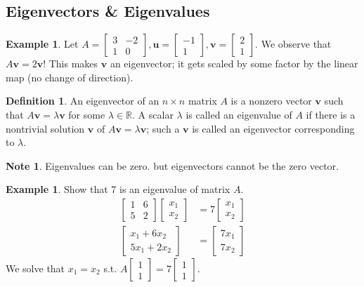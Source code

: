 \documentclass{article}
\numberwithin{equation}{section}
\theoremstyle{definition}
\newtheorem{defn}{Definition}[subsection]
\newtheorem{ex}[thm]{Example}
\newtheorem{note}{Note}[subsection]
\newcommand{\V}{\mathbf{v}}
\newcommand{\U}{\mathbf{u}}
\newcommand{\R}{\mathbb{R}}
\newcommand{\x}{\times}
\theoremstyle{adefn}
\begin{document}
	\subsection{Eigenvectors \& Eigenvalues}
	\begin{ex}
		Let $A = \begin{bmatrix}
			3 & -2 \\ 1 & 0
		\end{bmatrix}, \U = \begin{bmatrix}
			-1 \\ 1
		\end{bmatrix}, \V = \begin{bmatrix}
			2 \\ 1
		\end{bmatrix}$. We observe that $A\V = 2\V$! This makes $\V$ an eigenvector; it gets scaled by some factor by the linear map (no change of direction). 
	\end{ex}
	\begin{defn}
		An eigenvector of an $n \x n$ matrix $A$ is a nonzero vector $\V$ such that $A\V = \lambda\V$ for some $\lambda \in \R$. A scalar $\lambda$ is called an eigenvalue of $A$ if there is a nontrivial solution $\V$ of $A\V = \lambda\V$; such a $\V$ is called an eigenvector corresponding to $\lambda$. 
	\end{defn}
	\begin{note}
		Eigenvalues can be zero. but eigenvectors cannot be the zero vector. 
	\end{note}
	\begin{ex}
		Show that 7 is an eigenvalue of matrix $A$. 
		\begin{align*}
			\begin{bmatrix}
				1 & 6 \\ 5 & 2
			\end{bmatrix}\begin{bmatrix}
				x_1 \\ x_2
			\end{bmatrix} &= 7\begin{bmatrix}
				x_1 \\ x_2
			\end{bmatrix} \\ 
			\begin{bmatrix}
				x_1 + 6x_2 \\ 
				5x_1 + 2x_2
			\end{bmatrix} &= \begin{bmatrix}
				7x_1 \\ 7x_2
			\end{bmatrix}
		\end{align*}
		We solve that $x_1 = x_2$ s.t. $A\begin{bmatrix}
			1 \\ 1
		\end{bmatrix} = 7\begin{bmatrix}
			1 \\ 1
		\end{bmatrix}$.
	\end{ex}
\end{document}
